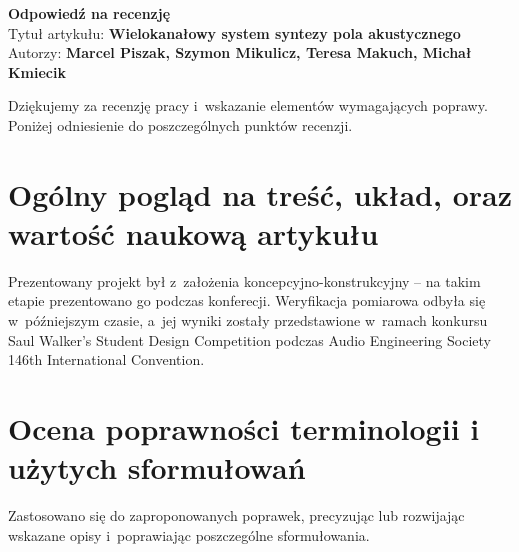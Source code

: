 \documentclass[12pt]{article}
\begin{document}
    \begin{center}
        \textbf{\large Odpowiedź na recenzję }\\
        \vspace{10pt}
        Tytuł artykułu: \textbf{Wielokanałowy system syntezy pola akustycznego}
        \\
        Autorzy: \textbf{Marcel Piszak, Szymon Mikulicz, Teresa Makuch, Michał
        Kmiecik}
    \end{center}

Dziękujemy za recenzję pracy i~wskazanie elementów wymagających poprawy.
Poniżej odniesienie do poszczególnych punktów recenzji.

\section{Ogólny pogląd na treść, układ, oraz wartość
naukową artykułu}

Prezentowany projekt był z~założenia koncepcyjno-konstrukcyjny -- na takim
etapie prezentowano go podczas konferecji. Weryfikacja pomiarowa odbyła się
w~późniejszym czasie, a~jej wyniki zostały przedstawione w~ramach konkursu Saul
Walker's Student Design Competition podczas Audio Engineering Society 146th
International Convention.

\section{Ocena poprawności terminologii i użytych sformułowań}

Zastosowano się do zaproponowanych poprawek, precyzując lub rozwijając wskazane
opisy i~poprawiając poszczególne sformułowania.
\end{document}
